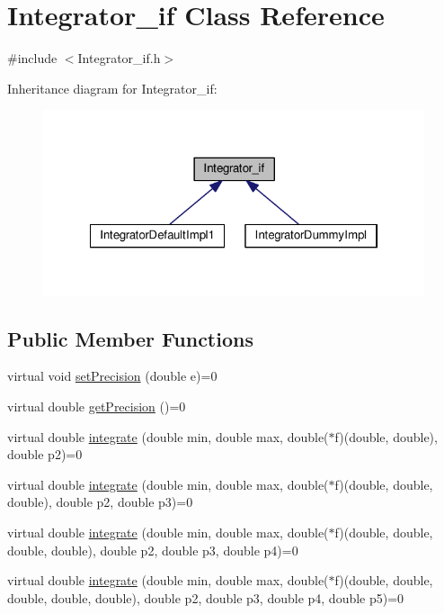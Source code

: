\hypertarget{class_integrator__if}{}\section{Integrator\+\_\+if Class Reference}
\label{class_integrator__if}


{\ttfamily \#include $<$Integrator\+\_\+if.\+h$>$}



Inheritance diagram for Integrator\+\_\+if\+:\nopagebreak
\begin{figure}[H]
\begin{center}
\leavevmode
\includegraphics[width=322pt]{class_integrator__if__inherit__graph}
\end{center}
\end{figure}
\subsection*{Public Member Functions}
\begin{DoxyCompactItemize}
\item 
virtual void \hyperlink{class_integrator__if_a49c27818a4b0caf41c39d22a18b41337}{set\+Precision} (double e)=0
\item 
virtual double \hyperlink{class_integrator__if_af3ab4e8ffa96c8970b2e3c980f84e89d}{get\+Precision} ()=0
\item 
virtual double \hyperlink{class_integrator__if_a841c836fd72d4c428178d1e28a999ec9}{integrate} (double min, double max, double($\ast$f)(double, double), double p2)=0
\item 
virtual double \hyperlink{class_integrator__if_a193d992d6101517249d9bee153607aa6}{integrate} (double min, double max, double($\ast$f)(double, double, double), double p2, double p3)=0
\item 
virtual double \hyperlink{class_integrator__if_a306e4fcb840f789d7a918550fa20cc28}{integrate} (double min, double max, double($\ast$f)(double, double, double, double), double p2, double p3, double p4)=0
\item 
virtual double \hyperlink{class_integrator__if_abaeac01142a4da07ba0f07a52732ac79}{integrate} (double min, double max, double($\ast$f)(double, double, double, double, double), double p2, double p3, double p4, double p5)=0
\end{DoxyCompactItemize}


